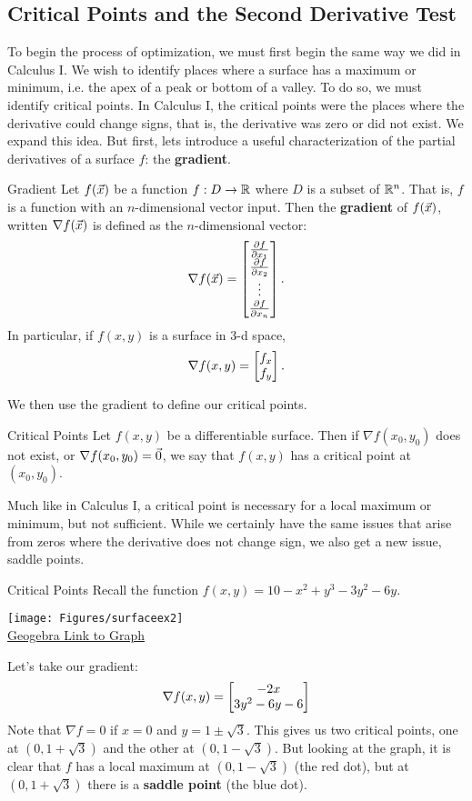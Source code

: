 
\subsection{Critical Points and the Second Derivative Test}
To begin the process of optimization, we must first begin the same way we did in Calculus I. We wish to identify places where a surface has a maximum or minimum, i.e. the apex of a peak or bottom of a valley. To do so, we must identify critical points. In Calculus I, the critical points were the places where the derivative could change signs, that is, the derivative was zero or did not exist. We expand this idea. But first, lets introduce a useful characterization of the partial derivatives of a surface $f$: the \textbf{gradient}.

\begin{definition}{Gradient}
Let $f(\vec{x})$ be a function $f:D\to \mathbb{R}$ where $D$ is a subset of $\mathbb{R}^n$. That is, $f$ is a function with an $n$-dimensional vector input. Then the \textbf{gradient} of $f(\vec{x})$, written $\nabla f(\vec{x})$ is defined as the $n$-dimensional vector:
$$\nabla f(\vec{x})=\begin{bmatrix}\frac{\partial f}{\partial x_1}\\ \frac{\partial f}{\partial x_2}\\ \vdots \\ \frac{\partial f}{\partial x_n}\end{bmatrix}. $$
In particular, if $f(x,y)$ is a surface in 3-d space, $$\nabla f(x,y)=\begin{bmatrix}f_x\\f_y\end{bmatrix}.$$
\end{definition}

We then use the gradient to define our critical points.

\begin{definition}{Critical Points}
Let $f(x,y)$ be a differentiable surface. Then if $\nabla f(x_0,y_0)$ does not exist, or $\nabla f(x_0,y_0)=\vec{0}$, we say that $f(x,y)$ has a critical point at $(x_0,y_0)$.
\end{definition}

Much like in Calculus I, a critical point is necessary for a local maximum or minimum, but not sufficient. While we certainly have the same issues that arise from zeros where the derivative does not change sign, we also get a new issue, saddle points. 

\begin{example}{Critical Points}
Recall the function $f(x,y)=10-x^2+y^3-3y^2-6y$.
\vspace{1em}
\begin{center}
\texttt{[image: Figures/surfaceex2]} \\
 \href{https://www.geogebra.org/3d/ekkscrcb}{Geogebra Link to Graph}
\end{center}
Let's take our gradient:
$$\nabla f(x,y)=\begin{bmatrix}-2x\\3y^2-6y-6\end{bmatrix} $$
Note that $\nabla f=0$ if $x=0$ and $y=1\pm\sqrt{3}$. This gives us two critical points, one at $(0,1+\sqrt{3})$ and the other at $(0,1-\sqrt{3})$. But looking at the graph, it is clear that $f$ has a local maximum at $(0,1-\sqrt{3})$ (the red dot), but at $(0,1+\sqrt{3})$ there is a \textbf{saddle point} (the blue dot).
\end{example}

